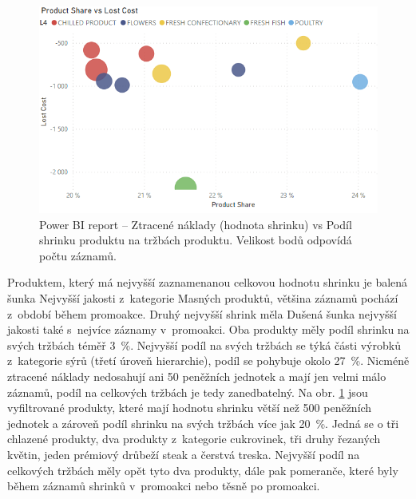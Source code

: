 \begin{figure}[h!]
    \centering
    \captionsetup{justification=centering}
    \includegraphics[width=.8\textwidth]{obrazky/PBI/l3pprductshare.png}
    \caption{Power BI report -- Ztracené náklady (hodnota shrinku) vs Podíl shrinku produktu na tržbách produktu. Velikost bodů odpovídá počtu záznamů.}
    \label{obr:PBI:l3prod}
\end{figure}

Produktem, který má nejvyšší zaznamenanou celkovou hodnotu shrinku je balená šunka Nejvyšší jakosti z~kategorie Masných produktů, většina záznamů pochází z~období během promoakce. Druhý nejvyšší shrink měla Dušená šunka nejvyšší jakosti také s~nejvíce záznamy v~promoakci. Oba produkty měly podíl shrinku na svých tržbách téměř 3~\%.  
Nejvyšší podíl na svých tržbách se týká části výrobků z~kategorie sýrů (třetí úroveň hierarchie), podíl se pohybuje okolo 27~\%. Nicméně ztracené náklady nedosahují ani 50 peněžních jednotek a mají jen velmi málo záznamů, podíl na celkových tržbách je tedy zanedbatelný.
Na obr. \ref*{obr:PBI:l3prod} jsou vyfiltrované produkty, které mají hodnotu shrinku větší než 500 peněžních jednotek a zároveň podíl shrinku na svých tržbách více jak 20~\%. Jedná se o tři chlazené produkty, dva produkty z~kategorie cukrovinek, tři druhy řezaných květin, jeden prémiový drůbeží steak a čerstvá treska. 
Nejvyšší podíl na celkových tržbách měly opět tyto dva produkty, dále pak pomeranče, které byly během záznamů shrinků v~promoakci nebo těsně po promoakci.